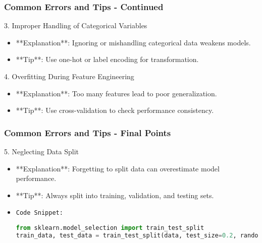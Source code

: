 \documentclass[aspectratio=169]{beamer}
\begin{document}
\begin{frame}[fragile]
    \frametitle{Common Errors and Tips - Continued}
    \begin{block}{3. Improper Handling of Categorical Variables}
        \begin{itemize}
            \item **Explanation**: Ignoring or mishandling categorical data weakens models.
            \item **Tip**: Use one-hot or label encoding for transformation.
        \end{itemize}
    \end{block}
    \begin{block}{4. Overfitting During Feature Engineering}
        \begin{itemize}
            \item **Explanation**: Too many features lead to poor generalization.
            \item **Tip**: Use cross-validation to check performance consistency.
        \end{itemize}
    \end{block}
\end{frame}

\begin{frame}[fragile]
    \frametitle{Common Errors and Tips - Final Points}
    \begin{block}{5. Neglecting Data Split}
        \begin{itemize}
            \item **Explanation**: Forgetting to split data can overestimate model performance.
            \item **Tip**: Always split into training, validation, and testing sets.
            \item \texttt{Code Snippet:}
            \begin{lstlisting}[language=Python]
from sklearn.model_selection import train_test_split
train_data, test_data = train_test_split(data, test_size=0.2, random_state=42)
            \end{lstlisting}
        \end{itemize}
    \end{block}
\end{frame}
\end{document}
